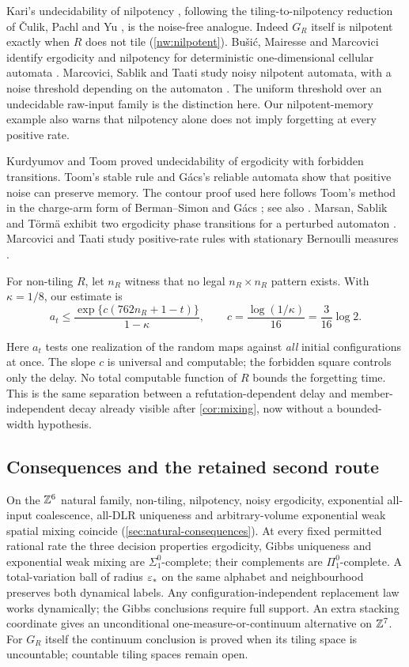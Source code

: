 Kari's undecidability of nilpotency \cite{Kari92}, following the tiling-to-nilpotency reduction of \v{C}ulik, Pachl and Yu \cite{CPY89}, is the noise-free analogue. Indeed $G_R$ itself is nilpotent exactly when $R$ does not tile (\cref{nw:nilpotent}). Bu\v{s}i\'c, Mairesse and Marcovici identify ergodicity and nilpotency for deterministic one-dimensional cellular automata \cite[Theorem~3.3]{BMM13}. Marcovici, Sablik and Taati study noisy nilpotent automata, with a noise threshold depending on the automaton \cite{MST19}. The uniform threshold over an undecidable raw-input family is the distinction here. Our nilpotent-memory example \cite{DMnil} also warns that nilpotency alone does not imply forgetting at every positive rate.

Kurdyumov \cite{Kurdyumov78} and Toom \cite{Toom00} proved undecidability of ergodicity with forbidden transitions. Toom's stable rule \cite{Toom80} and G\'acs's reliable automata \cite{Gacs01} show that positive noise can preserve memory. The contour proof used here follows Toom's method in the charge-arm form of Berman--Simon and G\'acs \cite{BermanSimon88,Gacs21}; see also \cite{SST26}. Marsan, Sablik and T\"orm\"a exhibit two ergodicity phase transitions for a perturbed automaton \cite{MarsanSablikTorma26}. Marcovici and Taati study positive-rate rules with stationary Bernoulli measures \cite{MT26}.

For non-tiling $R$, let $n_R$ witness that no legal $n_R\times n_R$ pattern exists. With
$\kappa=1/8$, our estimate is
\[
  a_t\le\frac{\exp\{c(762n_R+1-t)\}}{1-\kappa},\qquad
  c=\frac{\log(1/\kappa)}{16}=\frac{3}{16}\log 2 .
\]

Here $a_t$ tests one realization of the random maps against \emph{all} initial configurations at once. The slope $c$ is universal and computable; the forbidden square controls only the delay. No total computable function of $R$ bounds the forgetting time. This is the same separation between a refutation-dependent delay and member-independent decay already visible after \cref{cor:mixing}, now without a bounded-width hypothesis.

\subsection{Consequences and the retained second route}

On the $\mathbb{Z}^6$ natural family, non-tiling, nilpotency, noisy ergodicity, exponential all-input coalescence, all-DLR uniqueness and arbitrary-volume exponential weak spatial mixing coincide (\cref{sec:natural-consequences}). At every fixed permitted rational rate the three decision properties ergodicity, Gibbs uniqueness and exponential weak mixing are $\Sigma^0_1$-complete; their complements are $\Pi^0_1$-complete. A total-variation ball of radius $\varepsilon_*$ on the same alphabet and neighbourhood preserves both dynamical labels. Any configuration-independent replacement law works dynamically; the Gibbs conclusions require full support. An extra stacking coordinate gives an unconditional one-measure-or-continuum alternative on $\mathbb{Z}^7$. For $G_R$ itself the continuum conclusion is proved when its tiling space is uncountable; countable tiling spaces remain open.

